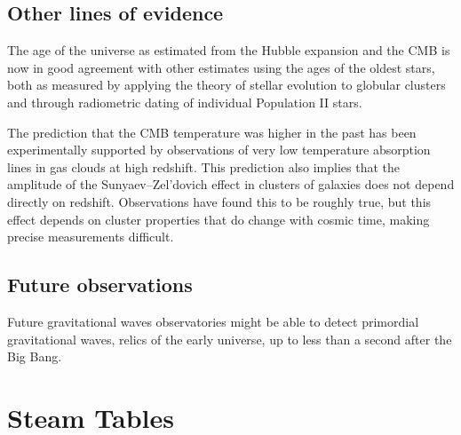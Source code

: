\documentclass[14pt, oneside]{book}
\begin{document}
		\section{Other lines of evidence}
			The age of the universe as estimated from the Hubble expansion and the CMB is now in good agreement with other estimates using the ages of the oldest stars, both as measured by applying the theory of stellar evolution to globular clusters and through radiometric dating of individual Population II stars.
			
			The prediction that the CMB temperature was higher in the past has been experimentally supported by observations of very low temperature absorption lines in gas clouds at high redshift. This prediction also implies that the amplitude of the Sunyaev–Zel'dovich effect in clusters of galaxies does not depend directly on redshift. Observations have found this to be roughly true, but this effect depends on cluster properties that do change with cosmic time, making precise measurements difficult.
			
		\section{Future observations}
			Future gravitational waves observatories might be able to detect primordial gravitational waves, relics of the early universe, up to less than a second after the Big Bang. 
	
	\chapter{Steam Tables}
		

	
	
\end{document}
